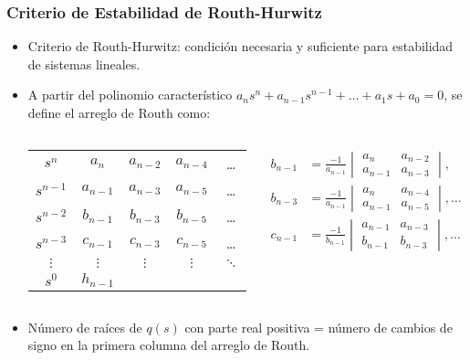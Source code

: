 \documentclass[aspectratio=169]{beamer}
\theoremstyle{definition}
\theoremstyle{plain}
\theoremstyle{remark}
\begin{document}
\begin{frame}[<+->]\frametitle{Criterio de Estabilidad de Routh-Hurwitz}
\begin{itemize}
	\item Criterio de Routh-Hurwitz: condición necesaria y suficiente para estabilidad de sistemas lineales.
	\item A partir del polinomio característico $a_n s^n + a_{n-1} s^{n-1} + \dots + a_1 s + a_0 = 0$, se define el arreglo de Routh como:
	\vspace{-5mm}
	\begin{columns}
	\begin{column}{0.5\textwidth}
	\begin{tabular}{c|cccc}
		$s^n$     & $a_n$     & $a_{n-2}$ & $a_{n-4}$ & \dots\\
		$s^{n-1}$ & $a_{n-1}$ & $a_{n-3}$ & $a_{n-5}$ & \dots\\
		$s^{n-2}$ & $b_{n-1}$ & $b_{n-3}$ & $b_{n-5}$ & \dots\\
		$s^{n-3}$ & $c_{n-1}$ & $c_{n-3}$ & $c_{n-5}$ & \dots\\
		$\vdots$ & $\vdots$ & $\vdots$ & $\vdots$ & $\ddots$\\
		$s^0$ & $h_{n-1}$ & & & 
	\end{tabular}
	\end{column}
	\begin{column}{0.5\textwidth}
	\begin{align*}
		b_{n-1} &= \frac{-1}{a_{n-1}}
		\begin{vmatrix}
			a_n     & a_{n-2}\\
			a_{n-1} & a_{n-3}
		\end{vmatrix},\\
		b_{n-3} &= \frac{-1}{a_{n-1}}
		\begin{vmatrix}
			a_n     & a_{n-4}\\
			a_{n-1} & a_{n-5}
		\end{vmatrix}, \dots\\
		c_{n-1} &= \frac{-1}{b_{n-1}}
		\begin{vmatrix}
			a_{n-1} & a_{n-3}\\
			b_{n-1} & b_{n-3}
		\end{vmatrix}, \dots\\
	\end{align*}
	\end{column}
	\end{columns}
	\vspace{-5mm}
	\item Número de raíces de $q(s)$ con parte real positiva = número de cambios de signo en la primera columna del arreglo de Routh.
\end{itemize}
\end{frame}
\end{document}
